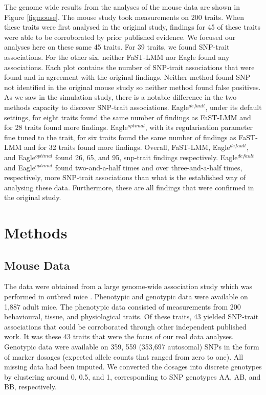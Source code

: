\documentclass{nature}
\begin{document}
The genome wide results from the analyses of the mouse data are shown in Figure  \ref{figmouse}. The mouse study took
measurements on 200 traits. When these traits were first analysed in the original study, findings for 45 of these traits were able to be 
corroborated by prior published evidence. We focused our analyses here on these same 45 traits. For 39 traits, we found SNP-trait associations. 
For the other six, neither FaST-LMM nor Eagle found any associations. 
Each plot contains the number of SNP-trait associations that were found and in agreement with the original findings. 
Neither method found SNP not identified in the original mouse study so neither method found false positives. 
As we saw in the simulation study, there is a notable difference in the two methods capacity to discover SNP-trait associations. Eagle$^{default}$, under its default settings, for eight traits found the same number of findings as FaST-LMM and for 28 traits found more findings. Eagle$^{optimal}$, 
with its regularisation parameter fine tuned to the trait, for six traits found the same number of findings as FaST-LMM and for 32 traits 
found more findings. Overall, FaST-LMM, Eagle$^{default}$, and Eagle$^{optimal}$ found 26, 65, and 95, snp-trait findings respectively. 
Eagle$^{default}$ and Eagle$^{optimal}$ found two-and-a-half times and over three-and-a-half times, respectively, more SNP-trait 
associations than what is the established way of analysing these data. Furthermore, these are all findings that were confirmed in the original study. 



\section{Methods}


\subsection{Mouse Data}

The data were obtained from a large genome-wide association study which was performed in outbred mice \cite{nicod2016genome}. 
Phenotypic and genotypic data were available on 1,887 adult mice. 
The phenotypic data consisted of measurements from 200 behavioural, tissue, and physiological traits.  Of these traits, 
43 yielded SNP-trait associations that could be corroborated through other independent published work. It was these 
43 traits that were the focus of our real data analyses. Genotypic data were available on 359, 559 (353,697 autosomal) SNPs in the 
form of marker dosages (expected allele counts that ranged from zero to one). All missing data had been imputed. 
We converted the dosages into discrete genotypes 
by clustering around 0, 0.5, and 1, corresponding to SNP genotypes AA, AB, and BB, respectively. 
\end{document}
